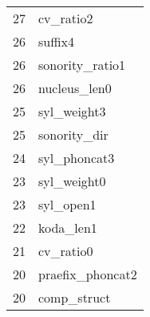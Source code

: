 \begin{table}
\begin{tabular}{|l|l|}
    27   & cv\_ratio2        \\
    26   & suffix4           \\
    26   & sonority\_ratio1  \\
    26   & nucleus\_len0     \\
    25   & syl\_weight3      \\
    25   & sonority\_dir     \\
    24   & syl\_phoncat3     \\
    23   & syl\_weight0      \\
    23   & syl\_open1        \\
    22   & koda\_len1        \\
    21   & cv\_ratio0        \\
    20   & praefix\_phoncat2 \\
    20   & comp\_struct      \\\hline
    \end{tabular}
\end{table}